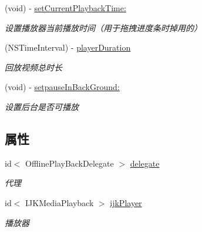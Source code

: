 \begin{DoxyCompactItemize}
\mbox{\label{interface_offline_play_back_a5073e3c5fa97621523a5a6a3b8163238}} 
(void) -\/ \hyperlink{interface_offline_play_back_a5073e3c5fa97621523a5a6a3b8163238}{set\+Current\+Playback\+Time\+:}
\begin{DoxyCompactList}\small\item\em 设置播放器当前播放时间（用于拖拽进度条时掉用的） \end{DoxyCompactList}\item 
\mbox{\label{interface_offline_play_back_acf85129c9552cbe05a4b925199385d32}} 
(N\+S\+Time\+Interval) -\/ \hyperlink{interface_offline_play_back_acf85129c9552cbe05a4b925199385d32}{player\+Duration}
\begin{DoxyCompactList}\small\item\em 回放视频总时长 \end{DoxyCompactList}\item 
\mbox{\label{interface_offline_play_back_aecc8a54b8b74b3b34e28d9d341b4dac1}} 
(void) -\/ \hyperlink{interface_offline_play_back_aecc8a54b8b74b3b34e28d9d341b4dac1}{setpause\+In\+Back\+Ground\+:}
\begin{DoxyCompactList}\small\item\em 设置后台是否可播放 \end{DoxyCompactList}\end{DoxyCompactItemize}
\subsection*{属性}
\begin{DoxyCompactItemize}
\item 
\mbox{\label{interface_offline_play_back_a27b124ec76c47345b93524a6bfd321e2}} 
id$<$ Offline\+Play\+Back\+Delegate $>$ \hyperlink{interface_offline_play_back_a27b124ec76c47345b93524a6bfd321e2}{delegate}
\begin{DoxyCompactList}\small\item\em 代理 \end{DoxyCompactList}\item 
\mbox{\label{interface_offline_play_back_a67fb8ebdc8ff25d7fd9feeb028b4432b}} 
id$<$ I\+J\+K\+Media\+Playback $>$ \hyperlink{interface_offline_play_back_a67fb8ebdc8ff25d7fd9feeb028b4432b}{ijk\+Player}
\begin{DoxyCompactList}\small\item\em 播放器 \end{DoxyCompactList}\end{DoxyCompactItemize}


